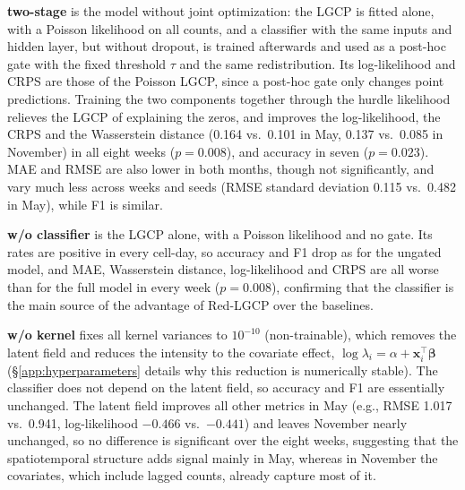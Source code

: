 \textbf{two-stage} is the model without joint optimization: the LGCP is fitted alone, with a Poisson likelihood on all counts, and a classifier with the same inputs and hidden layer, but without dropout, is trained afterwards and used as a post-hoc gate with the fixed threshold $\tau$ and the same redistribution. Its log-likelihood and CRPS are those of the Poisson LGCP, since a post-hoc gate only changes point predictions. Training the two components together through the hurdle likelihood relieves the LGCP of explaining the zeros, and improves the log-likelihood, the CRPS and the Wasserstein distance (0.164 vs.\ 0.101 in May, 0.137 vs.\ 0.085 in November) in all eight weeks ($p=0.008$), and accuracy in seven ($p=0.023$). MAE and RMSE are also lower in both months, though not significantly, and vary much less across weeks and seeds (RMSE standard deviation 0.115 vs.\ 0.482 in May), while F1 is similar.

\textbf{w/o classifier} is the LGCP alone, with a Poisson likelihood and no gate. Its rates are positive in every cell-day, so accuracy and F1 drop as for the ungated model, and MAE, Wasserstein distance, log-likelihood and CRPS are all worse than for the full model in every week ($p=0.008$), confirming that the classifier is the main source of the advantage of Red-LGCP over the baselines.

\textbf{w/o kernel} fixes all kernel variances to $10^{-10}$ (non-trainable), which removes the latent field and reduces the intensity to the covariate effect, $\log\lambda_i=\alpha+\mathbf{x}_i^\top\boldsymbol{\beta}$ (\S\ref{app:hyperparameters} details why this reduction is numerically stable). The classifier does not depend on the latent field, so accuracy and F1 are essentially unchanged. The latent field improves all other metrics in May (e.g., RMSE 1.017 vs.\ 0.941, log-likelihood $-0.466$ vs.\ $-0.441$) and leaves November nearly unchanged, so no difference is significant over the eight weeks, suggesting that the spatiotemporal structure adds signal mainly in May, whereas in November the covariates, which include lagged counts, already capture most of it.

